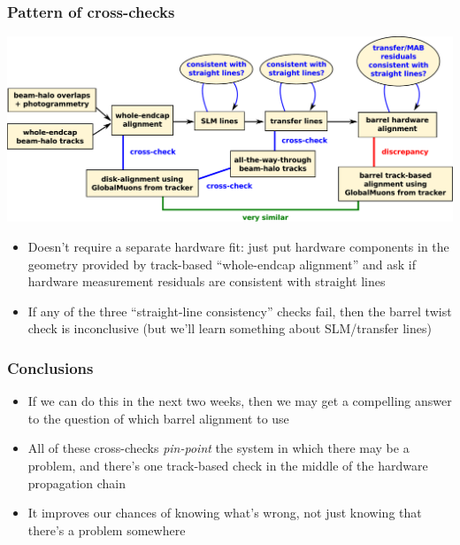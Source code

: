 \documentclass[compress]{beamer}
\begin{document}
\begin{frame}
\frametitle{Pattern of cross-checks}

\includegraphics[width=\linewidth]{together.pdf}

\begin{itemize}
\item Doesn't require a separate hardware fit: just put hardware
  components in the geometry provided by track-based ``whole-endcap
  alignment'' and ask if hardware measurement residuals are consistent
  with straight lines
\item If any of the three ``straight-line consistency'' checks fail,
  then the barrel twist check is inconclusive (but we'll learn
  something about SLM/transfer lines)
\end{itemize}
\end{frame}


\begin{frame}
\frametitle{Conclusions}
\begin{itemize}\setlength{\itemsep}{0.3 cm}
\item If we can do this in the next two weeks, then we may get a
  compelling answer to the question of which barrel alignment to use

\item All of these cross-checks {\it pin-point} the system in which
  there may be a problem, and there's one track-based check in the
  middle of the hardware propagation chain

\item It improves our chances of knowing what's wrong, not just
  knowing that there's a problem somewhere
\end{itemize}
\label{numpages}
\end{frame}
\end{document}
